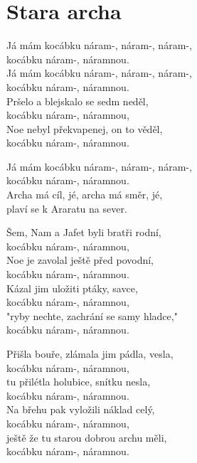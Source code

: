 \section{Stara archa}
\onehalfspacing

{}Já mám kocábku náram-, náram-, náram-,\\
      kocábku náram-, náramnou. \\
{}Já mám kocábku náram-, náram-, náram-,\\
      kocábku náram-, náramnou. \\

Pršelo a blejskalo se sedm neděl,\\
   kocábku náram-, náramnou,\\
   Noe nebyl překvapenej, on to věděl,\\
   kocábku náram-, náramnou.\\

\begin{multicols}{2}
\singlespacing

{}Já mám kocábku náram-, náram-, náram-,\\
      kocábku náram-, náramnou. \\

{}Archa má cíl, jé, archa má směr, jé,\\
   plaví se k Araratu na sever.\\

\sloka
Šem, Nam a Jafet byli bratři rodní,\\
   kocábku náram-, náramnou,\\
   Noe je zavolal ještě před povodní,\\
   kocábku náram-, náramnou.\\

\sloka
Kázal jim uložiti ptáky, savce,\\
   kocábku náram-, náramnou,\\
   "ryby nechte, zachrání se samy hladce,"\\
   kocábku náram-, náramnou.\\

{}
{}

\sloka
Přišla bouře, zlámala jim pádla, vesla,\\
   kocábku náram-, náramnou,\\
   tu přilétla holubice, snítku nesla,\\
   kocábku náram-, náramnou.\\

\sloka
Na břehu pak vyložili náklad celý,\\
   kocábku náram-, náramnou,\\
   ještě že tu starou dobrou archu měli,\\
   kocábku náram-, náramnou.\\

{}
{}
{}

\end{multicols}
